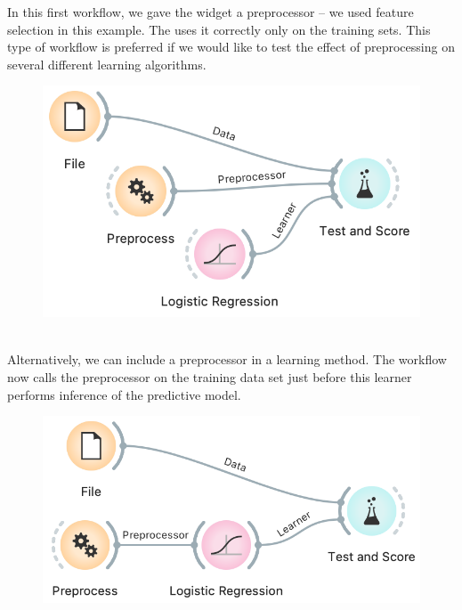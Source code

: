 
In this first workflow, we gave the  widget a preprocessor -- we used feature selection in this example. The  uses it correctly only on the training sets. This type of workflow is preferred if we would like to test the effect of preprocessing on several different learning algorithms.

\begin{figure}[h]
    \centering
    \includegraphics[scale=0.5]{preprocessor-to-cv.png}
    \caption{$\;$}
\end{figure}

Alternatively, we can include a preprocessor in a learning method. The workflow now calls the preprocessor on the training data set just before this learner performs inference of the predictive model.

\begin{figure}[h]
    \centering
    \includegraphics[scale=0.5]{preprocessor-to-lr.png}
    \caption{$\;$}
\end{figure}

